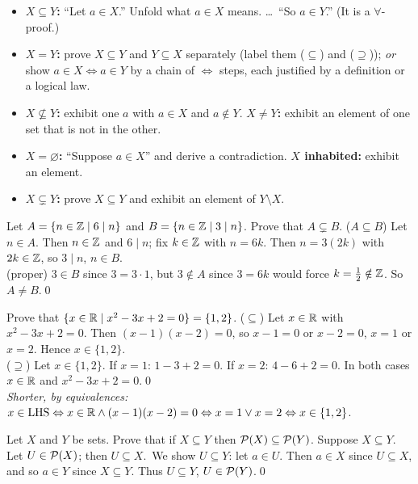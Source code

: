 \begin{strategy}
\begin{itemize}
\item \textbf{$X\subseteq Y$:} ``Let $a\in X$.'' Unfold what $a\in X$ means. \dots\ ``So $a\in Y$.'' (It is a $\forall$-proof.)
\item \textbf{$X=Y$:} prove $X\subseteq Y$ and $Y\subseteq X$ separately (label them ($\subseteq$) and ($\supseteq$)); \emph{or} show $a\in X\Leftrightarrow a\in Y$ by a chain of $\Leftrightarrow$ steps, each justified by a definition or a logical law.
\item \textbf{$X\not\subseteq Y$:} exhibit one $a$ with $a\in X$ and $a\notin Y$. \quad \textbf{$X\neq Y$:} exhibit an element of one set that is not in the other.
\item \textbf{$X=\varnothing$:} ``Suppose $a\in X$'' and derive a contradiction. \quad \textbf{$X$ inhabited:} exhibit an element.
\item \textbf{$X\subsetneq Y$:} prove $X\subseteq Y$ and exhibit an element of $Y\setminus X$.
\end{itemize}
\end{strategy}

\begin{hexample}
Let $A=\{n\in\mathbb{Z}\mid 6\mid n\}$ and $B=\{n\in\mathbb{Z}\mid 3\mid n\}$. Prove that $A\subsetneq B$.
\solution
($A\subseteq B$) Let $n\in A$. Then $n\in\mathbb{Z}$ and $6\mid n$; fix $k\in\mathbb{Z}$ with $n=6k$. Then $n=3(2k)$ with $2k\in\mathbb{Z}$, so $3\mid n$, \ie $n\in B$.\\
(proper) $3\in B$ since $3=3\cdot1$, but $3\notin A$ since $3=6k$ would force $k=\tfrac12\notin\mathbb{Z}$. So $A\neq B$.\qed
\end{hexample}

\begin{hexample}
Prove that $\{x\in\mathbb{R}\mid x^2-3x+2=0\}=\{1,2\}$.
\solution
($\subseteq$) Let $x\in\mathbb{R}$ with $x^2-3x+2=0$. Then $(x-1)(x-2)=0$, so $x-1=0$ or $x-2=0$, \ie $x=1$ or $x=2$. Hence $x\in\{1,2\}$.\\
($\supseteq$) Let $x\in\{1,2\}$. If $x=1$: $1-3+2=0$. If $x=2$: $4-6+2=0$. In both cases $x\in\mathbb{R}$ and $x^2-3x+2=0$.\qed\\[2pt]
\emph{Shorter, by equivalences:} $x\in\text{LHS}\Leftrightarrow x\in\mathbb{R}\wedge(x-1)(x-2)=0\Leftrightarrow x=1\vee x=2\Leftrightarrow x\in\{1,2\}$.
\end{hexample}

\begin{hexample}\label{ex:powinc}
Let $X$ and $Y$ be sets. Prove that if $X\subseteq Y$ then $\mathcal{P}(X)\subseteq\mathcal{P}(Y)$.
\solution
Suppose $X\subseteq Y$. Let $U\in\mathcal{P}(X)$; then $U\subseteq X$.\ We show $U\subseteq Y$: let $a\in U$. Then $a\in X$ since $U\subseteq X$, and so $a\in Y$ since $X\subseteq Y$. Thus $U\subseteq Y$, \ie $U\in\mathcal{P}(Y)$.\qed
\end{hexample}

